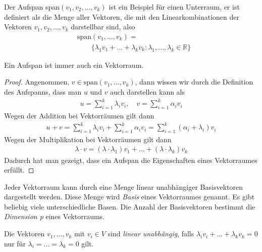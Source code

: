 Der Aufspan span$(v_1, v_2,\dots,v_k)$ ist ein Beispiel für einen Unterraum, er ist definiert als die Menge aller Vektoren, die mit den Linearkombinationen der Vektoren $v_1, v_2, \dots, v_k$ darstellbar sind, also
\begin{align*}
&\text{span}(v_1,\dots,v_k) =\\ &\qquad \{\lambda_1v_1+\dots+\lambda_kv_k : \lambda_1, \dots, \lambda_k \in \mathbb{R}\}
\end{align*}



\begin{theorem}
Ein Aufspan ist immer auch ein Vektorraum.
\end{theorem}
\begin{proof} 
Angenommen, $v \in \text{span}(v_1,\dots,v_k)$,
dann wissen wir durch die Definition des Aufspanns, dass man $u$ und $v$ auch darstellen kann als
\begin{align*}
u = \sum\limits_{i=1}^{k} \lambda_iv_i, \quad v = \sum\limits_{i=1}^{k} \alpha_iv_i
\end{align*}
Wegen der Addition bei Vektorr\"aumen gilt dann
\begin{align*}
	u + v = \sum\limits_{i=1}^{k} \lambda_iv_i + \sum\limits_{i=1}^{k} \alpha_iv_i= \sum\limits_{i=1}^{k} (\alpha_i+\lambda_i)v_i
\end{align*}
Wegen der Multiplikation bei Vektorr\"aumen gilt dann
\begin{align*}
	\lambda\cdot v = (\lambda \cdot \lambda_1) v_1+\dots+(\lambda \cdot \lambda_k)v_k
\end{align*}
Dadurch hat man gezeigt, dass ein Aufspan die Eigenschaften eines Vektorraumes erf\"ullt.
\end{proof}
Jeder Vektorraum kann durch eine Menge linear unabh\"angiger Basisvektoren dargestellt werden. Diese Menge wird \textit{Basis} eines Vektorraumes genannt. Es gibt beliebig viele unterschiedliche Basen. Die Anzahl der Basisvektoren bestimmt die \textit{Dimension p} eines Vektorraums.

Die Vektoren $v_1,\dots,v_k$ mit $v_i \in V$ sind \textit{linear unabh\"angig}, falls $\lambda_iv_i+\dots+\lambda_kv_k = 0$ nur f\"ur $\lambda_i=\dots=\lambda_k= 0$ gilt. 

%
